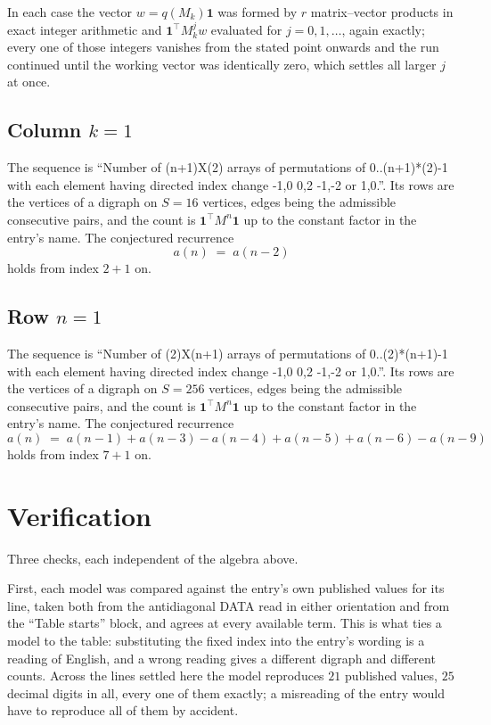 \documentclass[11pt,a4paper]{article}
\theoremstyle{plain}
\theoremstyle{definition}
\begin{document}
In each case the vector $w=q(M_k)\mathbf{1}$ was formed by $r$ matrix--vector products in
exact integer arithmetic and $\mathbf{1}^{\!\top}M_k^{j}w$ evaluated for $j=0,1,\dots$,
again exactly; every one of those integers vanishes from the stated point onwards and the run
continued until the working vector was identically zero, which settles all larger $j$ at once.

\subsection*{Column $k$$=1$}
The sequence is ``Number of (n+1)X(2) arrays of permutations of 0..(n+1)*(2)-1 with each element having directed index change -1,0 0,2 -1,-2 or 1,0.''. Its rows are the vertices of a digraph on
$S=16$ vertices, edges being the admissible consecutive pairs, and the count is
$\mathbf{1}^{\!\top}M^{n}\mathbf{1}$ up to the constant factor in the entry's name.
The conjectured recurrence
\[
a(n)\;=\;a(n-2)
\]
holds from index $2+1$ on.

\subsection*{Row $n$$=1$}
The sequence is ``Number of (2)X(n+1) arrays of permutations of 0..(2)*(n+1)-1 with each element having directed index change -1,0 0,2 -1,-2 or 1,0.''. Its rows are the vertices of a digraph on
$S=256$ vertices, edges being the admissible consecutive pairs, and the count is
$\mathbf{1}^{\!\top}M^{n}\mathbf{1}$ up to the constant factor in the entry's name.
The conjectured recurrence
\[
a(n)\;=\;a(n-1) + a(n-3) - a(n-4) + a(n-5) + a(n-6) - a(n-9)
\]
holds from index $7+1$ on.

\section{Verification}

Three checks, each independent of the algebra above.

First, each model was compared against the entry's own published values for its line, taken
both from the antidiagonal DATA read in either orientation and from the ``Table starts''
block, and agrees at every available term. This is what ties a model to the table:
substituting the fixed index into the entry's wording is a reading of English, and a wrong
reading gives a different digraph and different counts. Across the lines settled here the
model reproduces $21$ published values, $25$ decimal digits in all, every one of
them exactly; a misreading of the entry would have to reproduce all of them by accident.
\end{document}
